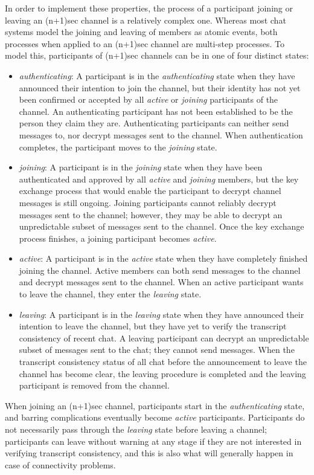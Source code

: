 \documentclass{article}
\begin{document}
In order to implement these properties, the process of a participant joining or leaving an (n+1)sec channel is a relatively complex one.
Whereas most chat systems model the joining and leaving of members as atomic events, both processes when applied to an (n+1)sec channel are multi-step processes.
To model this, participants of (n+1)sec channels can be in one of four distinct states:
\begin{itemize}
\item \emph{authenticating}: A participant is in the \emph{authenticating} state when they have announced their intention to join the channel, but their identity has not yet been confirmed or accepted by all \emph{active} or \emph{joining} participants of the channel. An authenticating participant has not been established to be the person they claim they are. Authenticating participants can neither send messages to, nor decrypt messages sent to the channel. When authentication completes, the participant moves to the \emph{joining} state.
\item \emph{joining}: A participant is in the \emph{joining} state when they have been authenticated and approved by all \emph{active} and \emph{joining} members, but the key exchange process that would enable the participant to decrypt channel messages is still ongoing. Joining participants cannot reliably decrypt messages sent to the channel; however, they may be able to decrypt an unpredictable subset of messages sent to the channel. Once the key exchange process finishes, a joining participant becomes \emph{active}.
\item \emph{active}: A participant is in the \emph{active} state when they have completely finished joining the channel. Active members can both send messages to the channel and decrypt messages sent to the channel. When an active participant wants to leave the channel, they enter the \emph{leaving} state.
\item \emph{leaving}: A participant is in the \emph{leaving} state when they have announced their intention to leave the channel, but they have yet to verify the transcript consistency of recent chat. A leaving participant can decrypt an unpredictable subset of messages sent to the chat; they cannot send messages. When the transcript consistency status of all chat before the announcement to leave the channel has become clear, the leaving procedure is completed and the leaving participant is removed from the channel.
\end{itemize}
When joining an (n+1)sec channel, participants start in the \emph{authenticating} state, and barring complications eventually become \emph{active} participants.
Participants do not necessarily pass through the \emph{leaving} state before leaving a channel; participants can leave without warning at any stage if they are not interested in verifying transcript consistency, and this is also what will generally happen in case of connectivity problems.
\end{document}

